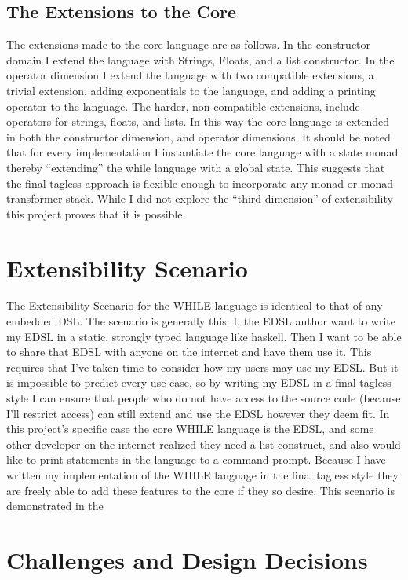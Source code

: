 \documentclass[9pt,letterpaper]{extarticle}
\begin{document}
  \subsection{The Extensions to the Core}
  The extensions made to the core language are as follows. In the constructor
  domain I extend the language with Strings, Floats, and a list constructor. In
  the operator dimension I extend the language with two compatible extensions, a
  trivial extension, adding exponentials to the language, and adding a printing
  operator to the language. The harder, non-compatible extensions, include
  operators for strings, floats, and lists. In this way the core language is
  extended in both the constructor dimension, and operator dimensions. It should
  be noted that for every implementation I instantiate the core language with a
  state monad thereby ``extending'' the while language with a global state. This
  suggests that the final tagless approach is flexible enough to incorporate any
  monad or monad transformer stack. While I did not explore the ``third
  dimension'' of extensibility this project proves that it is possible. 

	\section{Extensibility Scenario}
  The Extensibility Scenario for the WHILE language is identical to that of any
  embedded DSL. The scenario is generally this: I, the EDSL author want to write
  my EDSL in a static, strongly typed language like haskell. Then I want to be
  able to share that EDSL with anyone on the internet and have them use it. This
  requires that I've taken time to consider how my users may use my EDSL. But it
  is impossible to predict every use case, so by writing my EDSL in a final
  tagless style I can ensure that people who do not have access to the source
  code (because I'll restrict access) can still extend and use the EDSL however
  they deem fit. In this project's specific case the core WHILE language is the
  EDSL, and some other developer on the internet realized they need a list
  construct, and also would like to print statements in the language to a
  command prompt. Because I have written my implementation of the WHILE language
  in the final tagless style they are freely able to add these features to the
  core if they so desire. This scenario is demonstrated in the 

  \section{Challenges and Design Decisions}
\end{document}

